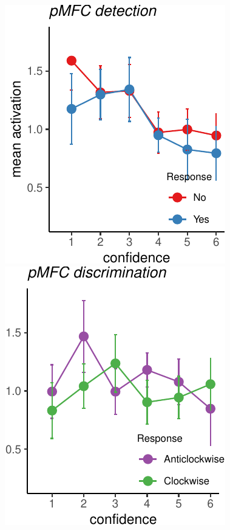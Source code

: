 \documentclass[
]{article}
\begin{document}
~

~

\includegraphics{Chudi-Thesis-2020_files/figure-latex/unnamed-chunk-10-1.pdf}
\includegraphics{Chudi-Thesis-2020_files/figure-latex/unnamed-chunk-10-2.pdf}
\end{document}
